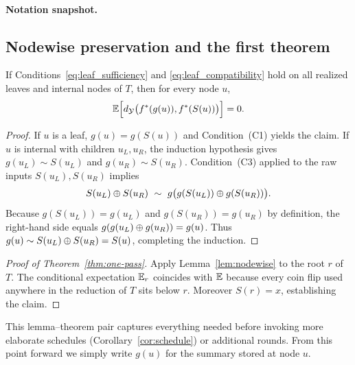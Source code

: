 \paragraph{Notation snapshot.}
\subsection{Nodewise preservation and the first theorem}

\begin{lemma}\label{lem:nodewise}
If Conditions~\eqref{eq:leaf_sufficiency} and \eqref{eq:leaf_compatibility} hold on all realized leaves and internal nodes of $T$, then for every node $u$,
\[
\mathbb{E}\Big[d_{\mathcal{Y}}\big(f^{\ast}(g(u)),f^{\ast}(S(u))\big)\Big]=0.
\]
\end{lemma}

\begin{proof}
If $u$ is a leaf, $g(u)=g(S(u))$ and Condition~(C1) yields the claim. If $u$ is internal with children $u_L,u_R$, the induction hypothesis gives $g(u_L)\sim S(u_L)$ and $g(u_R)\sim S(u_R)$. Condition~(C3) applied to the raw inputs $S(u_L),S(u_R)$ implies
\[
S(u_L)\concat S(u_R)\ \sim\ g\big(g(S(u_L))\concat g(S(u_R))\big).
\]
Because $g(S(u_L))=g(u_L)$ and $g(S(u_R))=g(u_R)$ by definition, the right-hand side equals $g(g(u_L)\oplus g(u_R))=g(u)$. Thus $g(u)\sim S(u_L)\oplus S(u_R)=S(u)$, completing the induction.
\end{proof}

\begin{proof}[Proof of Theorem~\ref{thm:one-pass}]
\label{proof:thm-one-pass}
Apply Lemma~\ref{lem:nodewise} to the root $r$ of $T$. The conditional expectation $\mathbb{E}_r$ coincides with $\mathbb{E}$ because every coin flip used anywhere in the reduction of $T$ sits below $r$. Moreover $S(r)=x$, establishing the claim.
\end{proof}

This lemma–theorem pair captures everything needed before invoking more elaborate schedules (Corollary~\ref{cor:schedule}) or additional rounds. From this point forward we simply write $g(u)$ for the summary stored at node $u$.
